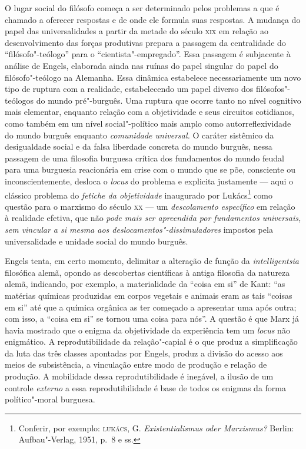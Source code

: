 O lugar social do filósofo começa a ser determinado pelos problemas a
que é chamado a oferecer respostas e de onde ele formula suas respostas.
A mudança do papel das universalidades a partir da metade do século
\textsc{xix} em relação ao desenvolvimento das forças produtivas prepara
a passagem da centralidade do ``filósofo"-teólogo'' para o
``cientista"-empregado''. Essa passagem é subjacente à análise de
Engels, elaborada ainda nas ruínas do papel singular do papel do
filósofo"-teólogo na Alemanha. Essa dinâmica estabelece necessariamente
um novo tipo de ruptura com a realidade, estabelecendo um papel diverso
dos filósofos"-teólogos do mundo pré"-burguês. Uma ruptura que ocorre
tanto no nível cognitivo mais elementar, enquanto relação com a
objetividade e seus circuitos cotidianos, como também em um nível
social"-político mais amplo como autorreflexividade do mundo burguês
enquanto \emph{comunidade universal.} O caráter sistêmico da
desigualdade social e da falsa liberdade concreta do mundo burguês,
nessa passagem de uma filosofia burguesa crítica dos fundamentos do
mundo feudal para uma burguesia reacionária em crise com o mundo que se
põe, consciente ou inconscientemente, desloca o \emph{locus} do problema
e explicita justamente --- aqui o clássico problema do \emph{fetiche da
objetividade} inaugurado por Lukács\footnote{Conferir, por exemplo:
  \textsc{lukács}, G. \emph{Existentialismus oder Marxismus?} Berlin:
  Aufbau"-Verlag, 1951, p.~8 e ss.} como questão para o marxismo do
século \textsc{xx} --- um \emph{descolamento específico} em relação à
realidade efetiva, que não \emph{pode mais ser apreendida por
fundamentos universais, sem vincular a si mesma aos
deslocamentos"-dissimuladores} impostos pela universalidade e unidade
social do mundo burguês.

Engels tenta, em certo momento, delimitar a alteração de função da
\emph{intelligentsia} filosófica alemã, opondo as descobertas
científicas à antiga filosofia da natureza alemã, indicando, por
exemplo, a materialidade da ``coisa em si'' de Kant: ``as matérias
químicas produzidas em corpos vegetais e animais eram as tais ``coisas
em si'' até que a química orgânica as ter começado a apresentar uma após %
outra; com isso, a ``coisa em si'' se tornou uma coisa para nós''. A
questão é que Marx já havia mostrado que o enigma da objetividade da
experiência tem um \emph{locus} não enigmático. A reprodutibilidade da
relação"-capial é o que produz a simplificação da luta das três classes
apontadas por Engels, produz a divisão do acesso aos meios de
subsistência, a vinculação entre modo de produção e relação de produção.
A mobilidade dessa reprodutibilidade é inegável, a ilusão de um controle
\emph{externo} a essa reprodutibilidade é base de todos os enigmas da
forma político"-moral burguesa.


